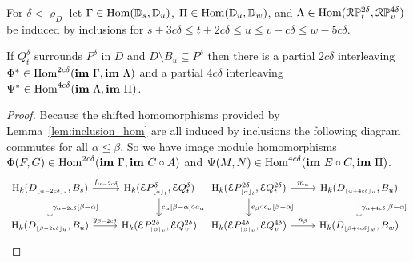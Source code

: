 \begin{lemma}\label{lem:partial_interleaving}
  For $\delta < \varrho_D$ let $\Gamma\in\mathrm{Hom}(\mathbb{D}_{s},\mathbb{D}_{u})$, $\Pi\in\mathrm{Hom}(\mathbb{D}_{u},\mathbb{D}_{w})$, and $\Lambda\in\mathrm{Hom}(\mathcal{R}\mathbb{P}_{t}^{2\delta}, \mathcal{R}\mathbb{P}_{v}^{4\delta})$ be induced by inclusions for $s + 3c\delta\leq t + 2c\delta\leq u\leq v-c\delta\leq w-5c\delta$.

  If $Q_{t}^\delta$ surrounds $P^\delta$ in $D$ and $D\setminus B_u\subseteq P^\delta$ then there is a partial $2c\delta$ interleaving $\Phi^*\in\mathrm{Hom}^{2c\delta}(\mathbf{im}~\Gamma, \mathbf{im}~\Lambda)$ and a partial $4c\delta$ interleaving $\Psi^*\in\mathrm{Hom}^{4c\delta}(\mathbf{im}~\Lambda, \mathbf{im}~\Pi)$.
\end{lemma}
\begin{proof}
  Because the shifted homomorphisms provided by Lemma~\ref{lem:inclusion_hom} are all induced by inclusions the following diagram commutes for all $\alpha\leq\beta$.
  So we have image module homomorphisms $\Phi(F, G)\in\mathrm{Hom}^{2c\delta}(\mathbf{im}~\Gamma, \mathbf{im}~C\circ A)$ and $\Psi(M, N)\in\mathrm{Hom}^{4c\delta}(\mathbf{im}~E\circ C, \mathbf{im}~\Pi)$.
  \[\begin{tikzcd}
      \hom_k(D\subi{s}{\alpha-2c\delta}, B_s) \arrow{r}{f_{\alpha-2c\delta}}\arrow{d}{\gamma_{\alpha-2c\delta}[\beta-\alpha]} &
      \hom_k(\E P\subi{t}{\alpha}^\delta, \E Q_t^\delta)\arrow{d}{c_\alpha[\beta-\alpha]\circ a_\alpha}\\
      \hom_k(D\subi{u}{\beta-2c\delta}, B_u)\arrow{r}{g_{\beta-2c\delta}} &
      \hom_k(\E P\subi{v}{\beta}^{2\delta}, \E Q_v^{2\delta})
    \end{tikzcd}
    \begin{tikzcd}
      \hom_k(\E P\subi{t}{\alpha}^{2\delta}, \E Q_t^{2\delta})\arrow{d}{e_\beta\circ c_\alpha[\beta-\alpha]}\arrow{r}{m_{\alpha}} &
      \hom_k(D\subi{u}{\alpha+4c\delta}, B_u)\arrow{d}{\gamma_{\alpha+4c\delta}[\beta-\alpha]}\\
      \hom_k(\E P\subi{v}{\beta}^{4\delta}, \E Q_v^{4\delta})\arrow{r}{n_\beta} &
      \hom_k(D\subi{w}{\beta+4c\delta}, B_w)
    \end{tikzcd}\]


\end{proof}
